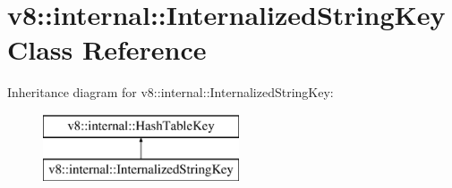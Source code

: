 \hypertarget{classv8_1_1internal_1_1_internalized_string_key}{}\section{v8\+:\+:internal\+:\+:Internalized\+String\+Key Class Reference}
\label{classv8_1_1internal_1_1_internalized_string_key}
Inheritance diagram for v8\+:\+:internal\+:\+:Internalized\+String\+Key\+:\begin{figure}[H]
\begin{center}
\leavevmode
\includegraphics[height=2.000000cm]{classv8_1_1internal_1_1_internalized_string_key}
\end{center}
\end{figure}
